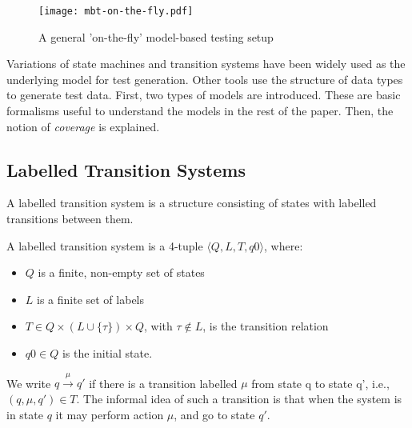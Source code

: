 \begin{figure}[h]
  \begin{center}
    \texttt{[image: mbt-on-the-fly.pdf]}
  \end{center}
  \caption{A general 'on-the-fly' model-based testing setup}
  \label{fig:model_based_testing_on_the_fly}
\end{figure}

Variations of state machines and transition systems have been widely used as the underlying model for test generation. Other tools use the structure of data types to generate test data. First, two types of models are introduced. These are basic formalisms useful to understand the models in the rest of the paper. Then, the notion of \textit{coverage} is explained.

\subsection{Labelled Transition Systems}
A labelled transition system is a structure consisting of states with labelled transitions between them.

\begin{definition}
A labelled transition system is a 4-tuple	$\langle Q, L, T, q0\rangle$, where:
\begin{itemize}
\item $Q$ is a finite, non-empty set of states
\item $L$ is a finite set of labels
\item $T \in Q \times (L \cup \{\tau\}) \times Q$, with $\tau \notin L$, is the transition relation
\item $q0 \in Q$ is the initial state.
\end{itemize}
We write $q \xrightarrow{\mu}q'$ if there is a transition labelled $\mu$ from state q to state q', i.e., $(q, \mu, q') \in T$. The informal idea of such a transition is that when the system is in state $q$ it may perform action $\mu$, and go to state $q'$. 
\end{definition}


